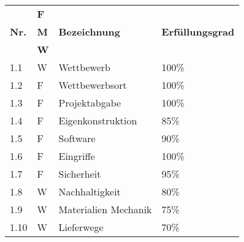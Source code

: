 \documentclass[main.tex]{subfiles} %
\begin{document}
\begin{tabular}{|l|p{0.5cm}|p{4cm}|p{10cm}|}
  \hline
               & \textbf{F} &                                  &                                                                                                                                                                                                                                                                                                                                                                                 \\
  \textbf{Nr.} & \textbf{M} & \textbf{Bezeichnung}             & \textbf{Erfüllungsgrad}                                                                                                                                                                                                                                                                                                                                                                                \\
               & \textbf{W} &                                  &                                                                                                                                                                                                                                                                                                                                                                         \\
  \hline
  1.1          & W              & Wettbewerb                   & 100\%                   \\
  1.2          & F              & Wettbewerbsort               & 100\%                   \\
  1.3          & F              & Projektabgabe                & 100\%                   \\
  1.4          & F              & Eigenkonstruktion            & 85\%                    \\
  1.5          & F              & Software                     & 90\%                    \\
  1.6          & F              & Eingriffe                    & 100\%                   \\
  1.7          & F              & Sicherheit                   & 95\%                    \\
  1.8          & W              & Nachhaltigkeit               & 80\%                    \\
  1.9          & W              & Materialien Mechanik          & 75\%                    \\
  1.10         & W              & Lieferwege                   & 70\%                    \\
  \hline
\end{tabular}
\end{document}
